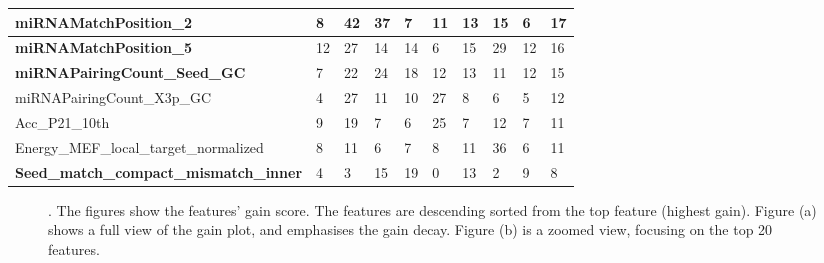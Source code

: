\documentclass{bmcart}
\begin{document}
\begin{table}[h!]
\begin{tabular}{|l|l|l|l|l|l|l|l|l|l|}
\textbf{miRNAMatchPosition\_2}                    & 8            & 42           & 37           & 7           & 11          & 13          & 15          & 6           & 17            \\ \hline
\textbf{miRNAMatchPosition\_5}                    & 12           & 27           & 14           & 14          & 6           & 15          & 29          & 12          & 16            \\ \hline
\textbf{miRNAPairingCount\_Seed\_GC}              & 7            & 22           & 24           & 18          & 12          & 13          & 11          & 12          & 15            \\ \hline
miRNAPairingCount\_X3p\_GC                        & 4            & 27           & 11           & 10          & 27          & 8           & 6           & 5           & 12            \\ \hline
Acc\_P21\_10th                                    & 9            & 19           & 7            & 6           & 25          & 7           & 12          & 7           & 11            \\ \hline
Energy\_MEF\_local\_target\_normalized            & 8            & 11           & 6            & 7           & 8           & 11          & 36          & 6           & 11            \\ \hline
\textbf{Seed\_match\_compact\_mismatch\_inner}    & 4            & 3            & 15           & 19          & 0           & 13          & 2           & 9           & 8             \\ \hline
\end{tabular}
\end{table}


\begin{figure}[h!]
    \centering
    \qquad
    \caption{. The figures show the features' gain score. The features are descending sorted from the top feature (highest gain). Figure (a) shows a full view of the gain plot, and emphasises the gain decay.  Figure (b) is a zoomed view, focusing on the top 20 features.}%
    \label{fig:feature_importance}%
\end{figure}
\end{document}
